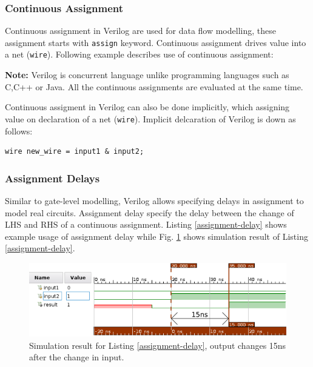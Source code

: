 \documentclass[a4paper,10pt]{article}
\theoremstyle{mytheor}
\newcommand{
  \insertverilog}[3]{
  
}
\begin{document}
\subsubsection{Continuous Assignment}
\label{continuous-assignment}
Continuous assignment in Verilog are used for data flow modelling,
these assignment starts with
\lstinline[style=verilog-inline-style]{assign} keyword. Continuous
assignment drives value into a net
(\lstinline[style=verilog-inline-style]{wire}). Following example
describes use of continuous assignment:

{\color{red}\textbf{Note:}} Verilog is concurrent language unlike
programming languages such as C,C++ or Java. All the continuous
assignments are evaluated at the same time.

\insertverilog{./verilog_files/continuousAssignment.v}{continuous-assignment}{Example usage of continuous assignment.}

Continuous assigment in Verilog can also be done implicitly, which
assigning value on declaration of a net
(\lstinline[style=verilog-inline-style]{wire}). Implicit delcaration
of Verilog is down as follows:
\begin{lstlisting}[style=verilog-inline-style,xleftmargin=.25\textwidth]
  wire new_wire = input1 & input2;
\end{lstlisting}

\subsubsection{Assignment Delays}
Similar to gate-level modelling, Verilog allows specifying delays in
assignment to model real circuits. Assignment delay specify the delay
between the change of LHS and RHS of a continuous assignment. Listing
\ref{assignment-delay} shows example usage of assignment delay while
Fig. \ref{assignment-delay-sim} shows simulation result of Listing
\ref{assignment-delay}.

\insertverilog{./verilog_files/assignmentDelay.v}{assignment-delay}{Using assignment delay in Verilog.}

\begin{figure}[!h] \centering  
  \includegraphics[width=0.8\linewidth]{./resources/assignmentDelay.png}
  \caption{Simulation result for Listing \ref{assignment-delay}, output changes 15ns after the change in input.} 
  \label{assignment-delay-sim}
\end{figure}
\end{document}

